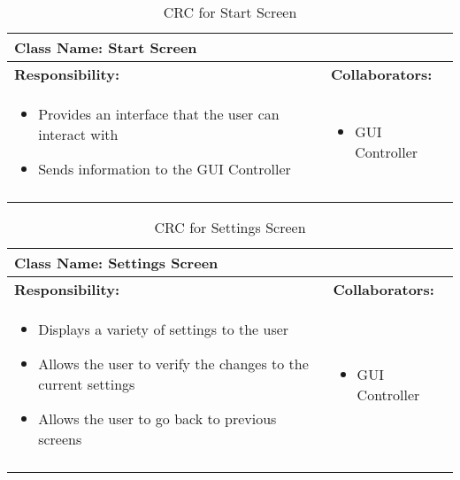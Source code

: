 \documentclass[titlepage]{article}
\begin{document}
	\begin{longtable}{| p{} | p{} |}
			\hline
			 \multicolumn{2}{|l|}{\textbf{Class Name: Start Screen}} \\
			\hline
			\textbf{Responsibility:} & \textbf{Collaborators:} \\
			\hline
				\begin{itemize}
					\item Provides an interface that the user can interact with
					\item Sends information to the GUI Controller
				\end{itemize} & 
				\begin{itemize}
					\item GUI Controller
				\end{itemize} 
				\\
			\hline
		\caption{CRC for Start Screen}
	\end{longtable}
	
	
\newpage
	\begin{longtable}{| p{} | p{} |}
			\hline
			 \multicolumn{2}{|l|}{\textbf{Class Name: Settings Screen}} \\
			\hline
			\textbf{Responsibility:} & \textbf{Collaborators:} \\
			\hline
				\begin{itemize}
					\item Displays a variety of settings to the user
					\item Allows the user to verify the changes to the current settings
					\item Allows the user to go back to previous screens
				\end{itemize} & 
				\begin{itemize}
					\item GUI Controller
				\end{itemize} 
				\\
			\hline
		\caption{CRC for Settings Screen}
	\end{longtable}
	
\end{document}
